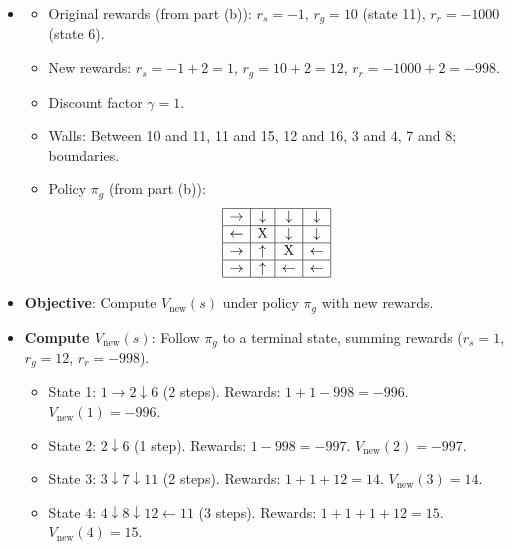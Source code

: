 \documentclass[a3paper,12pt]{extarticle} %
\begin{document}
\begin{enumerate}
    \begin{itemize}
        \item 
        \begin{itemize}
            \item Original rewards (from part (b)): \( r_s = -1 \), \( r_g = 10 \) (state 11), \( r_r = -1000 \) (state 6).
            \item New rewards: \( r_s = -1 + 2 = 1 \), \( r_g = 10 + 2 = 12 \), \( r_r = -1000 + 2 = -998 \).
            \item Discount factor \( \gamma = 1 \).
            \item Walls: Between 10 and 11, 11 and 15, 12 and 16, 3 and 4, 7 and 8; boundaries.
            \item Policy \( \pi_g \) (from part (b)):
            \[
            \begin{array}{|c|c|c|c|}
            \hline
            \rightarrow & \downarrow & \downarrow & \downarrow \\
            \hline
            \leftarrow & \text{X} & \downarrow & \downarrow \\
            \hline
            \rightarrow & \uparrow & \text{X} & \leftarrow \\
            \hline
            \rightarrow & \uparrow & \leftarrow & \leftarrow \\
            \hline
            \end{array}
            \]
        \end{itemize}
        \item \textbf{Objective}: Compute \( V_{\text{new}}(s) \) under policy \( \pi_g \) with new rewards.
        \item \textbf{Compute \( V_{\text{new}}(s) \)}: Follow \( \pi_g \) to a terminal state, summing rewards (\( r_s = 1 \), \( r_g = 12 \), \( r_r = -998 \)).
        \begin{itemize}
            \item State 1: \( 1 \rightarrow 2 \downarrow 6 \) (2 steps). Rewards: \( 1 + 1 - 998 = -996 \). \( V_{\text{new}}(1) = -996 \).
            \item State 2: \( 2 \downarrow 6 \) (1 step). Rewards: \( 1 - 998 = -997 \). \( V_{\text{new}}(2) = -997 \).
            \item State 3: \( 3 \downarrow 7 \downarrow 11 \) (2 steps). Rewards: \( 1 + 1 + 12 = 14 \). \( V_{\text{new}}(3) = 14 \).
            \item State 4: \( 4 \downarrow 8 \downarrow 12 \leftarrow 11 \) (3 steps). Rewards: \( 1 + 1 + 1 + 12 = 15 \). \( V_{\text{new}}(4) = 15 \).

\end{itemize}
\end{itemize}
\end{enumerate}
\end{document}
